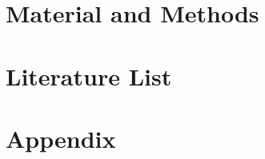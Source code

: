 \documentclass[a4paper]{article}
\begin{document}

\newpage

\section{Material and Methods}\label{mat_met}

\newpage



\newpage


\newpage



\newpage

\section*{Literature List}
\printbibliography

\newpage

\section{Appendix}

\end{document}
